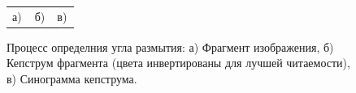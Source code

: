 \begin{figure}[H]
\begin{minipage}[h]{0.32\linewidth}
\end{minipage}
\hfill
\begin{minipage}[h]{0.32\linewidth}
\end{minipage}
\begin{minipage}[h]{1\linewidth}
\begin{tabular}{p{0.32\linewidth}p{0.32\linewidth}p{0.32\linewidth}}
\centering а) & \centering б) & \centering в) \\
\end{tabular}
\end{minipage}
\vspace*{-1cm}
\caption{Процесс определния угла размытия: а) Фрагмент изображения, б) Кепструм фрагмента (цвета инвертированы для лучшей читаемости), в) Синограмма кепструма.}
\label{ris:correlationsignals}
\end{figure}

